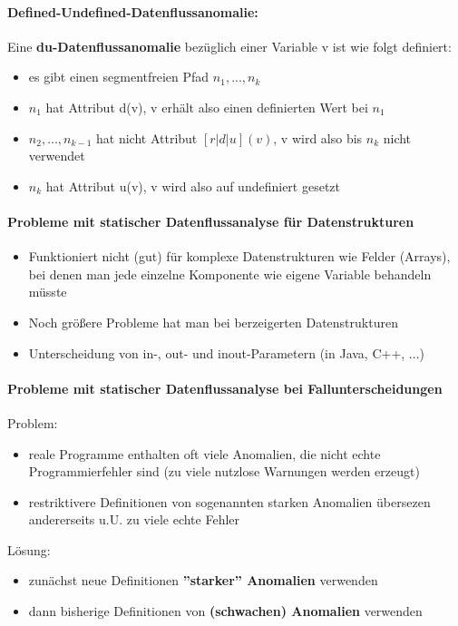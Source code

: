 \paragraph{Defined-Undefined-Datenflussanomalie:}
Eine \textbf{du-Datenflussanomalie} bezüglich einer Variable v ist wie folgt definiert:
\begin{itemize}
	\item es gibt einen segmentfreien Pfad $n_{1}, ... , n_{k}$
	\item $n_{1}$ hat Attribut d(v), v erhält also einen definierten Wert bei $n_{1}$
	\item $n_{2}, ... , n_{k-1}$ hat nicht Attribut $[r|d|u](v)$, v wird also bis $n_{k}$ nicht verwendet
	\item $n_{k}$ hat Attribut u(v), v wird also auf undefiniert gesetzt
\end{itemize}

\paragraph{Probleme mit statischer Datenflussanalyse für Datenstrukturen}
\begin{itemize}
	\item Funktioniert nicht (gut) für komplexe Datenstrukturen wie Felder (Arrays), bei denen man jede einzelne Komponente wie eigene Variable behandeln müsste
	\item Noch größere Probleme hat man bei berzeigerten Datenstrukturen
	\item Unterscheidung von in-, out- und inout-Parametern (in Java, C++, ...)
\end{itemize}

\paragraph{Probleme mit statischer Datenflussanalyse bei Fallunterscheidungen}
Problem:
\begin{itemize}
	\item reale Programme enthalten oft viele Anomalien, die nicht echte Programmierfehler sind (zu viele nutzlose Warnungen werden erzeugt)
	\item restriktivere Definitionen von sogenannten starken Anomalien übersezen andererseits u.U. zu viele echte Fehler
\end{itemize}
Lösung:
\begin{itemize}
	\item zunächst neue Definitionen \textbf{''starker'' Anomalien} verwenden
	\item dann bisherige Definitionen von \textbf{(schwachen) Anomalien} verwenden
\end{itemize}

